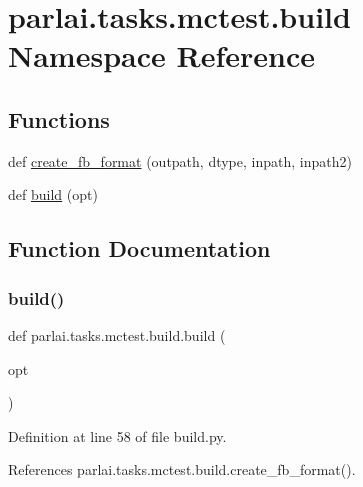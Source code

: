 \hypertarget{namespaceparlai_1_1tasks_1_1mctest_1_1build}{}\section{parlai.\+tasks.\+mctest.\+build Namespace Reference}
\label{namespaceparlai_1_1tasks_1_1mctest_1_1build}
\subsection*{Functions}
\begin{DoxyCompactItemize}
\item 
def \hyperlink{namespaceparlai_1_1tasks_1_1mctest_1_1build_a7d827f19f83b7d60f4ed1dbabade06cf}{create\+\_\+fb\+\_\+format} (outpath, dtype, inpath, inpath2)
\item 
def \hyperlink{namespaceparlai_1_1tasks_1_1mctest_1_1build_aed15e288ff3209606d79f5cbfee86b5a}{build} (opt)
\end{DoxyCompactItemize}


\subsection{Function Documentation}
\mbox{\label{namespaceparlai_1_1tasks_1_1mctest_1_1build_aed15e288ff3209606d79f5cbfee86b5a}} 
\subsubsection{\texorpdfstring{build()}{build()}}
{\footnotesize\ttfamily def parlai.\+tasks.\+mctest.\+build.\+build (\begin{DoxyParamCaption}\item[{}]{opt }\end{DoxyParamCaption})}



Definition at line 58 of file build.\+py.



References parlai.\+tasks.\+mctest.\+build.\+create\+\_\+fb\+\_\+format().

